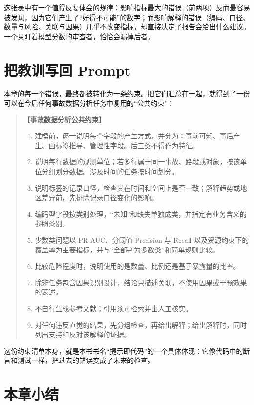 这张表中有一个值得反复体会的规律：影响指标最大的错误（前两项）反而最容易被发现，因为它们产生了“好得不可能”的数字；而影响解释的错误（编码、口径、数量与风险、关联与因果）几乎不改变指标，却直接决定了报告会给出什么建议。一个只盯着模型分数的审查者，恰恰会漏掉后者。

\section{把教训写回 Prompt}

本章的每一个错误，最终都被转化为一条约束。把它们汇总在一起，就得到了一份可以在今后任何事故数据分析任务中复用的“公共约束”：

\begin{quote}
\textbf{【事故数据分析公共约束】}
\begin{enumerate}
  \item 建模前，逐一说明每个字段的产生方式，并分为：事前可知、事后产生、由标签推导、管理性字段。后三类不得作为特征。
  \item 说明每行数据的观测单位；若多行属于同一事故、路段或对象，按该单位分组划分数据。涉及时间的任务按时间划分。
  \item 说明标签的记录口径，检查其在时间和空间上是否一致；解释趋势或地区差异前，先排除记录口径变化的影响。
  \item 编码型字段按类别处理，“未知”和缺失单独成类，并指定有业务含义的参照类别。
  \item 少数类问题以 PR-AUC、分阈值 Precision 与 Recall 以及资源约束下的覆盖率为主要指标，并与“全部判为多数类”和简单规则比较。
  \item 比较危险程度时，说明使用的是数量、比例还是基于暴露量的比率。
  \item 除非任务包含因果识别设计，结论只描述关联，不使用因果或干预效果的表述。
  \item 不自行生成参考文献；引用须可检索并由人工核实。
  \item 对任何违反直觉的结果，先分组检查，再给出解释；给出解释时，同时列出支持和反对该解释的证据。
\end{enumerate}
\end{quote}

这份约束清单本身，就是本书书名“提示即代码”的一个具体体现：它像代码中的断言和测试一样，把过去的错误变成了未来的检查。

\section{本章小结}

